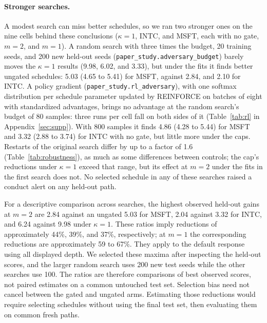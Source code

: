 \documentclass{article}
\begin{document}
\paragraph{Stronger searches.} A modest search can miss better schedules, so we ran two stronger ones on the nine cells behind these conclusions ($\kappa = 1$, INTC, and MSFT, each with no gate, $m = 2$, and $m = 1$). A random search with three times the budget, 20 training seeds, and 200 new held-out seeds (\texttt{paper\_study.adversary\_budget}) barely moves the $\kappa = 1$ results (9.98, 6.02, and 3.33), but under the fits it finds better ungated schedules: 5.03 (4.65 to 5.41) for MSFT, against 2.84, and 2.10 for INTC. A policy gradient (\texttt{paper\_study.rl\_adversary}), with one softmax distribution per schedule parameter updated by REINFORCE on batches of eight with standardized advantages, brings no advantage at the random search's budget of 80 samples: three runs per cell fall on both sides of it (Table~\ref{tab:rl} in Appendix~\ref{sec:supp}). With 800 samples it finds 4.86 (4.28 to 5.44) for MSFT and 3.32 (2.88 to 3.74) for INTC with no gate, but little more under the caps. Restarts of the original search differ by up to a factor of 1.6 (Table~\ref{tab:robustness}), as much as some differences between controls; the cap's reductions under $\kappa = 1$ exceed that range, but its effect at $m = 2$ under the fits in the first search does not. No selected schedule in any of these searches raised a conduct alert on any held-out path.

For a descriptive comparison across searches, the highest observed held-out gains at $m = 2$ are 2.84 against an ungated 5.03 for MSFT, 2.04 against 3.32 for INTC, and 6.24 against 9.98 under $\kappa = 1$. These ratios imply reductions of approximately 44\%, 39\%, and 37\%, respectively; at $m = 1$ the corresponding reductions are approximately 59 to 67\%. They apply to the default response using all displayed depth. We selected these maxima after inspecting the held-out scores, and the larger random search uses 200 new test seeds while the other searches use 100. The ratios are therefore comparisons of best observed scores, not paired estimates on a common untouched test set. Selection bias need not cancel between the gated and ungated arms. Estimating those reductions would require selecting schedules without using the final test set, then evaluating them on common fresh paths.
\end{document}
